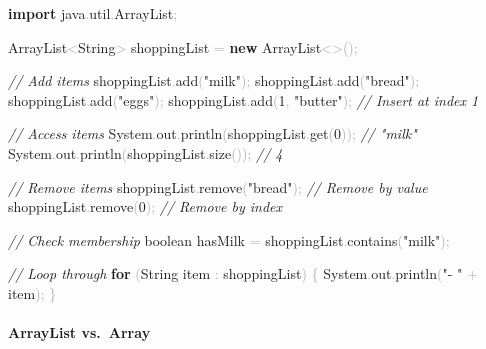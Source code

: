 \documentclass[
  justified,
  openright,
]{tufte-book}
\let\subsection\paragraph
\let\paragraph\paragraph
\newcommand{\KeywordTok}[1]{\textcolor{CodeKeyword}{\textbf{#1}}}  %
\newcommand{\StringTok}[1]{\textcolor{CodeString}{#1}}              %
\newcommand{\CommentTok}[1]{\textcolor{CodeComment}{\textit{#1}}}  %
\newcommand{\CodeNumTok}[1]{\textcolor{CodeNumber}{#1}}             %
\newcommand{\CodeFuncTok}[1]{\textcolor{CodeKeyword}{#1}}           %
\newcommand{\CodeTypeTok}[1]{\textcolor{CodeType}{#1}}              %
\newcommand{\CodeAccentTok}[1]{\textcolor{CodeAccent}{#1}}          %
\newcommand{\OperatorTok}[1]{\textcolor{DarkGray}{#1}}              %
\newenvironment{Shaded}{%
  \begin{mdframed}[style=TufteCode]%
}{%
  \end{mdframed}%
}
\let\subsection\paragraph
\let\paragraph\paragraph
\begin{document}
\begin{Shaded}
\begin{Highlighting}[]
\KeywordTok{import} \CodeAccentTok{java}\OperatorTok{.}\CodeAccentTok{util}\OperatorTok{.}\CodeAccentTok{ArrayList}\OperatorTok{;}
 
ArrayList\OperatorTok{\textless{}}String\OperatorTok{\textgreater{}} shoppingList \OperatorTok{=} \KeywordTok{new} ArrayList\OperatorTok{\textless{}\textgreater{}();}
 
\CommentTok{// Add items}
shoppingList\OperatorTok{.}\CodeFuncTok{add}\OperatorTok{(}\StringTok{"milk"}\OperatorTok{);}
shoppingList\OperatorTok{.}\CodeFuncTok{add}\OperatorTok{(}\StringTok{"bread"}\OperatorTok{);}
shoppingList\OperatorTok{.}\CodeFuncTok{add}\OperatorTok{(}\StringTok{"eggs"}\OperatorTok{);}
shoppingList\OperatorTok{.}\CodeFuncTok{add}\OperatorTok{(}\CodeNumTok{1}\OperatorTok{,} \StringTok{"butter"}\OperatorTok{);}   \CommentTok{// Insert at index 1}
 
\CommentTok{// Access items}
System\OperatorTok{.}\CodeFuncTok{out}\OperatorTok{.}\CodeFuncTok{println}\OperatorTok{(}shoppingList\OperatorTok{.}\CodeFuncTok{get}\OperatorTok{(}\CodeNumTok{0}\OperatorTok{));}          \CommentTok{// "milk"}
System\OperatorTok{.}\CodeFuncTok{out}\OperatorTok{.}\CodeFuncTok{println}\OperatorTok{(}shoppingList\OperatorTok{.}\CodeFuncTok{size}\OperatorTok{());}           \CommentTok{// 4}
 
\CommentTok{// Remove items}
shoppingList\OperatorTok{.}\CodeFuncTok{remove}\OperatorTok{(}\StringTok{"bread"}\OperatorTok{);}                     \CommentTok{// Remove by value}
shoppingList\OperatorTok{.}\CodeFuncTok{remove}\OperatorTok{(}\CodeNumTok{0}\OperatorTok{);}                           \CommentTok{// Remove by index}
 
\CommentTok{// Check membership}
\CodeTypeTok{boolean} hasMilk \OperatorTok{=} shoppingList\OperatorTok{.}\CodeFuncTok{contains}\OperatorTok{(}\StringTok{"milk"}\OperatorTok{);}
 
\CommentTok{// Loop through}
\KeywordTok{for} \OperatorTok{(}String item \OperatorTok{:} shoppingList\OperatorTok{)} \OperatorTok{\{}
    System\OperatorTok{.}\CodeFuncTok{out}\OperatorTok{.}\CodeFuncTok{println}\OperatorTok{(}\StringTok{"{-} "} \OperatorTok{+} item\OperatorTok{);}
\OperatorTok{\}}
\end{Highlighting}
\end{Shaded}

\subsection{ArrayList vs.~Array}\label{arraylist-vs.-array}
\end{document}
